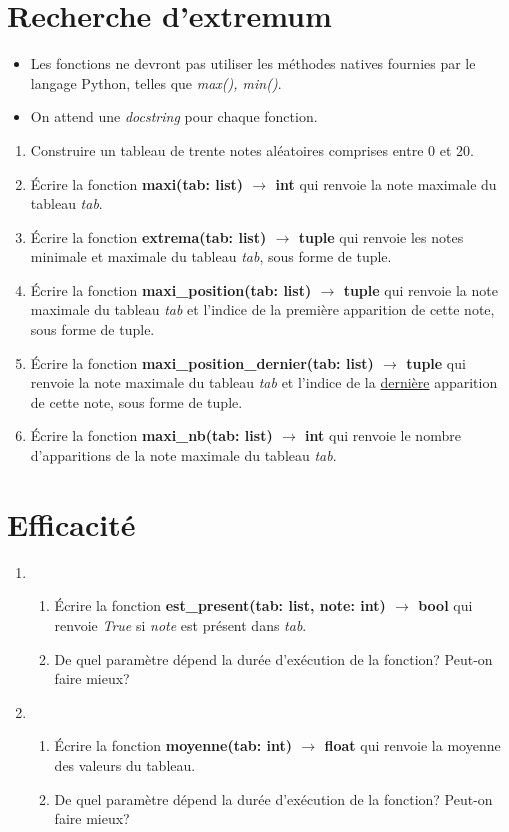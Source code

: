 \documentclass[a4paper,11pt]{article}
\begin{document}
\section{Recherche d'extremum}
\begin{aretenir}[Remarques]
\begin{itemize}
    \item Les fonctions ne devront pas utiliser les méthodes natives fournies par le langage Python, telles que \emph{max(), min()}.
    \item On attend une \emph{docstring} pour chaque fonction.
\end{itemize}
\end{aretenir}
\begin{enumerate}
    \item Construire un tableau de trente notes aléatoires comprises entre 0 et 20.
    \item Écrire la fonction \textbf{maxi(tab: list) $\rightarrow$ int} qui renvoie la note maximale du tableau \emph{tab}.
    \item Écrire la fonction \textbf{extrema(tab: list) $\rightarrow$ tuple} qui renvoie les notes minimale et maximale du tableau \emph{tab}, sous forme de tuple.
    \item Écrire la fonction \textbf{maxi\_position(tab: list) $\rightarrow$ tuple} qui renvoie la note maximale du tableau \emph{tab} et l'indice de la première apparition de cette note, sous forme de tuple.
    \item Écrire la fonction \textbf{maxi\_position\_dernier(tab: list) $\rightarrow$ tuple} qui renvoie la note maximale du tableau \emph{tab} et l'indice de la \underline{dernière} apparition de cette note, sous forme de tuple.
    \item Écrire la fonction \textbf{maxi\_nb(tab: list) $\rightarrow$ int} qui renvoie le nombre d'apparitions de la note maximale du tableau \emph{tab}.

\end{enumerate}
\section{Efficacité}
\begin{enumerate}
    \item \begin{enumerate}
              \item Écrire la fonction \textbf{est\_present(tab: list, note: int) $\rightarrow$ bool} qui renvoie \emph{True} si \emph{note} est présent dans \emph{tab}.
              \item De quel paramètre dépend la durée d'exécution de la fonction? Peut-on faire mieux?
          \end{enumerate}
    \item \begin{enumerate}
              \item Écrire la fonction \textbf{moyenne(tab: int) $\rightarrow$ float} qui renvoie la moyenne des valeurs du tableau.
              \item De quel paramètre dépend la durée d'exécution de la fonction? Peut-on faire mieux?
          \end{enumerate}
\end{enumerate}
\end{document}
